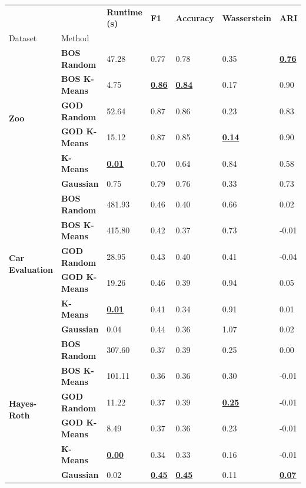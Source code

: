 \begin{table}
\begin{adjustbox}{width=\columnwidth}
\begin{tabular}{lllllll}
\toprule
 &  & \textbf{Runtime (s)} & \textbf{F1} & \textbf{Accuracy} & \textbf{Wasserstein} & \textbf{ARI} \\
Dataset & Method &  &  &  &  &  \\
\midrule
\multirow[t]{6}{*}{\textbf{Zoo}} & \textbf{BOS Random} & 47.28 & 0.77 & 0.78 & 0.35 & \textbf{\underline{0.76}} \\
\textbf{} & \textbf{BOS K-Means} & 4.75 & \textbf{\underline{0.86}} & \textbf{\underline{0.84}} & 0.17 & 0.90 \\
\textbf{} & \textbf{GOD Random} & 52.64 & 0.87 & 0.86 & 0.23 & 0.83 \\
\textbf{} & \textbf{GOD K-Means} & 15.12 & 0.87 & 0.85 & \textbf{\underline{0.14}} & 0.90 \\
\textbf{} & \textbf{K-Means} & \textbf{\underline{0.01}} & 0.70 & 0.64 & 0.84 & 0.58 \\
\textbf{} & \textbf{Gaussian} & 0.75 & 0.79 & 0.76 & 0.33 & 0.73 \\
\cline{1-7}
\multirow[t]{6}{*}{\textbf{Car Evaluation}} & \textbf{BOS Random} & 481.93 & 0.46 & 0.40 & 0.66 & 0.02 \\
\textbf{} & \textbf{BOS K-Means} & 415.80 & 0.42 & 0.37 & 0.73 & -0.01 \\
\textbf{} & \textbf{GOD Random} & 28.95 & 0.43 & 0.40 & 0.41 & -0.04 \\
\textbf{} & \textbf{GOD K-Means} & 19.26 & 0.46 & 0.39 & 0.94 & 0.05 \\
\textbf{} & \textbf{K-Means} & \textbf{\underline{0.01}} & 0.41 & 0.34 & 0.91 & 0.01 \\
\textbf{} & \textbf{Gaussian} & 0.04 & 0.44 & 0.36 & 1.07 & 0.02 \\
\cline{1-7}
\multirow[t]{6}{*}{\textbf{Hayes-Roth}} & \textbf{BOS Random} & 307.60 & 0.37 & 0.39 & 0.25 & 0.00 \\
\textbf{} & \textbf{BOS K-Means} & 101.11 & 0.36 & 0.36 & 0.30 & -0.01 \\
\textbf{} & \textbf{GOD Random} & 11.22 & 0.37 & 0.39 & \textbf{\underline{0.25}} & -0.01 \\
\textbf{} & \textbf{GOD K-Means} & 8.49 & 0.37 & 0.36 & 0.23 & -0.01 \\
\textbf{} & \textbf{K-Means} & \textbf{\underline{0.00}} & 0.34 & 0.33 & 0.16 & -0.01 \\
\textbf{} & \textbf{Gaussian} & 0.02 & \textbf{\underline{0.45}} & \textbf{\underline{0.45}} & 0.11 & \textbf{\underline{0.07}} \\

\end{tabular}
\end{adjustbox}
\end{table}
